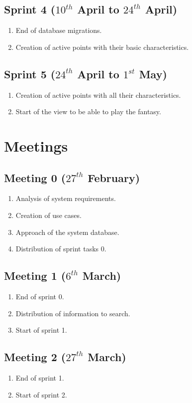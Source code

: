 \subsection{Sprint 4 ($10^{th}$ April to $24^{th}$ April)}
\begin{enumerate}
	\item End of database migrations.
	\item Creation of active points with their basic characteristics.
\end{enumerate}

\subsection{Sprint 5 ($24^{th}$ April to $1^{st}$ May)}
\begin{enumerate}
	\item Creation of active points with all their characteristics.
	\item Start of the view to be able to play the fantasy.
\end{enumerate}


\section{Meetings}
\subsection{Meeting 0 ($27^{th}$ February)}
\begin{enumerate}
	\item Analysis of system requirements.
	\item Creation of use cases.
	\item Approach of the system database.
	\item Distribution of sprint tasks 0.
\end{enumerate}

\subsection{Meeting 1 ($6^{th}$ March)}
\begin{enumerate}
	\item End of sprint 0.
	\item Distribution of information to search.
	\item Start of sprint 1.
\end{enumerate}

\subsection{Meeting 2 ($27^{th}$ March)}
\begin{enumerate}
	\item End of sprint 1.
	\item Start of sprint 2.
\end{enumerate}

